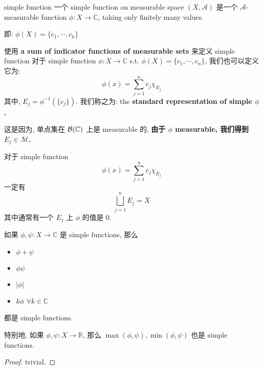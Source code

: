 \documentclass[lang=cn,11pt]{elegantbook}
\begin{document}
\begin{definition}{simple function}
    一个 simple function on measurable space $(X,\mathcal{A})$ 是一个 $\mathcal{A}$-measurable function $\phi:X \rightarrow \mathbb{C}$, taking only finitely many values.

即: $\phi(X) = \{c_1,\cdots, c_k\}$
\end{definition}

\begin{proposition}{使用 \textbf{a sum of indicator functions of measurable sets} 来定义 simple function}
对于 simple function $\phi:X \rightarrow \mathbb{C}$ s.t. $\phi(X) =\{ c_1,\cdots,c_n\} $, 我们也可以定义它为:  $$
    \phi(x) = \sum_{j=1}^n c_j \chi_{E_j}
    $$
其中, $E_j  =  \phi^{-1}(\{c_j\})$.
我们称之为: the \textbf{standard representation of simple $\phi$.}
\end{proposition}
这是因为, 单点集在 $\mathcal{B}(\mathbb{C})$ 上是 measurable 的, \textbf{由于 $\phi$ measurable, 我们得到 $E_j \in \mathcal{M}$.}
\begin{remark}
    对于 simple function $$
    \phi(x) = \sum_{j=1}^n c_j \chi_{E_j}
    $$ 一定有 $$
    \bigsqcup_{j=1}^n E_j = X
    $$其中通常有一个 $E_j$ 上 $\phi$ 的值是 0.
\end{remark}



\begin{lemma}
    如果 $\phi, \psi: X \rightarrow \mathbb{C}$ 是 simple functions, 那么 
    \begin{itemize}
        \item  $\phi + \psi$
        \item $\phi \psi$
        \item $|\phi|$
        \item $k\phi$ $\forall k \in \mathbb{C}$
    \end{itemize}
都是 simple functions.

特别地, 如果  $\phi, \psi: X \rightarrow  \mathbb{R}$, 那么 $
\max(\phi,\psi), \min(\phi,\psi)
$ 也是 simple functions.
\end{lemma}
\begin{proof}
    trivial.
\end{proof}
\end{document}
